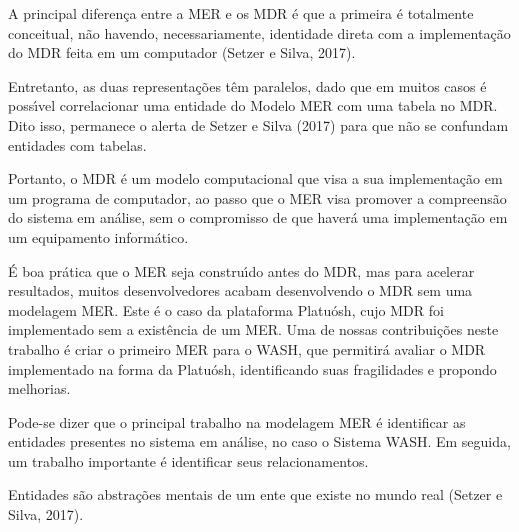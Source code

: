 \documentclass[
12pt,		%
openright,	%
twoside,  %
a4paper,			%
chapter=TITLE,		%
english,			%
french,				%
spanish,			%
brazil				%
]{USPSC-classe/USPSC}
\begin{document}
A principal diferen\c{c}a entre a MER e os MDR \'e que a primeira \'e totalmente conceitual, n\~ao havendo, necessariamente, identidade direta com a implementa\c{c}\~ao do MDR feita em um computador  (Setzer e Silva, 2017).










Entretanto, as duas representa\c{c}\~oes t\^em paralelos, dado que em muitos casos \'e poss\'{\i}vel correlacionar uma entidade do Modelo MER com uma tabela no MDR. Dito isso, permanece o alerta de  Setzer e Silva (2017) para que n\~ao se confundam entidades com tabelas.










Portanto, o MDR \'e um modelo computacional que visa a sua implementa\c{c}\~ao em um programa de computador, ao passo que o MER visa promover a compreens\~ao do sistema em an\'alise, sem o compromisso de que haver\'a uma implementa\c{c}\~ao em um equipamento inform\'atico.










\'E boa pr\'atica que o MER seja constru\'{\i}do antes do MDR, mas para acelerar resultados, muitos desenvolvedores acabam desenvolvendo o MDR sem uma modelagem MER. Este \'e o caso da plataforma Platu\'osh, cujo MDR foi implementado sem a exist\^encia de um MER. Uma de nossas contribui\c{c}\~oes neste trabalho \'e criar o primeiro MER para o WASH, que permitir\'a avaliar o MDR implementado na forma da Platu\'osh, identificando suas fragilidades e propondo melhorias.










Pode-se dizer que o principal trabalho na modelagem MER \'e identificar as entidades presentes no sistema em an\'alise, no caso o Sistema WASH. Em seguida, um trabalho importante \'e identificar seus relacionamentos.










Entidades s\~ao abstra\c{c}\~oes mentais de um ente que existe no mundo real  (Setzer e Silva, 2017).
\end{document}
